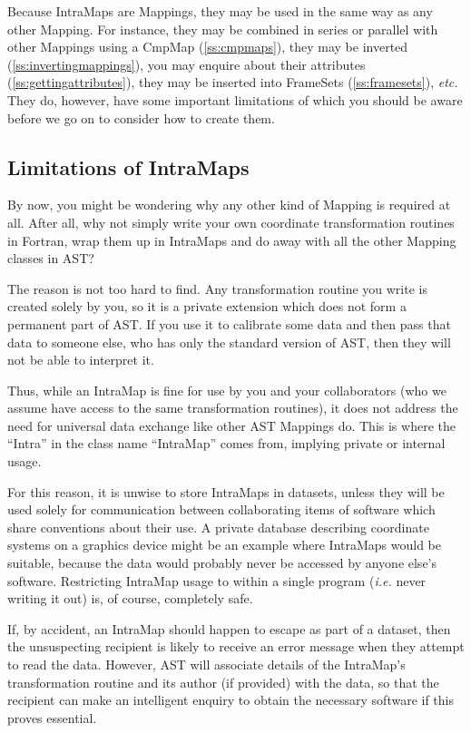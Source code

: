 \documentclass[twoside,11pt]{article}
\newcommand{\htmlref}[2]{#1}
\newcommand{\secref}[1]{\S\ref{#1}}
\renewcommand{\secref}[1]{\ref{#1}}
\begin{document}
Because IntraMaps are Mappings, they may be used in the same way as
any other Mapping. For instance, they may be combined in series or
parallel with other Mappings using a \htmlref{CmpMap}{CmpMap} (\secref{ss:cmpmaps}),
they may be inverted (\secref{ss:invertingmappings}), you may enquire
about their attributes (\secref{ss:gettingattributes}), they may be
inserted into FrameSets (\secref{ss:framesets}), {\em{etc.}} They do,
however, have some important limitations of which you should be aware
before we go on to consider how to create them.

\subsection{\label{ss:intramaplimitations}Limitations of IntraMaps}

By now, you might be wondering why any other kind of \htmlref{Mapping}{Mapping} is
required at all. After all, why not simply write your own coordinate
transformation routines in Fortran, wrap them up in IntraMaps and do
away with all the other Mapping classes in AST?

The reason is not too hard to find. Any transformation routine you
write is created solely by you, so it is a private extension which
does not form a permanent part of AST. If you use it to calibrate some
data and then pass that data to someone else, who has only the
standard version of AST, then they will not be able to interpret it.

Thus, while an \htmlref{IntraMap}{IntraMap} is fine for use by you and your collaborators
(who we assume have access to the same transformation routines), it
does not address the need for universal data exchange like other AST
Mappings do. This is where the ``Intra'' in the class name
``IntraMap'' comes from, implying private or internal usage.

For this reason, it is unwise to store IntraMaps in datasets, unless
they will be used solely for communication between collaborating items
of software which share conventions about their use.  A private
database describing coordinate systems on a graphics device might be
an example where IntraMaps would be suitable, because the data would
probably never be accessed by anyone else's software. Restricting
IntraMap usage to within a single program ({\em{i.e.}} never writing
it out) is, of course, completely safe.

If, by accident, an IntraMap should happen to escape as part of a
dataset, then the unsuspecting recipient is likely to receive an error
message when they attempt to read the data. However, AST will
associate details of the IntraMap's transformation routine and its
author (if provided) with the data, so that the recipient can make an
intelligent enquiry to obtain the necessary software if this proves
essential.
\end{document}
